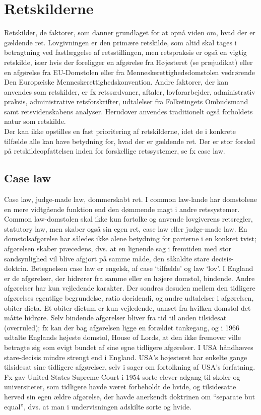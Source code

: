 \documentclass[]{book}
\begin{document}
\hypertarget{retskilderne}{%
\section{Retskilderne}\label{retskilderne}}

Retskilder, de faktorer, som danner grundlaget for at opnå viden om, hvad der er gældende ret.
Lovgivningen er den primære retskilde, som altid skal tages i betragtning ved fastlæggelse af retsstillingen, men retspraksis er også en vigtig retskilde, især hvis der foreligger en afgørelse fra Højesteret (se præjudikat) eller en afgørelse fra EU-Domstolen eller fra Menneskerettighedsdomstolen vedrørende Den Europæiske Menneskerettighedskonvention.
Andre faktorer, der kan anvendes som retskilder, er fx retssædvaner, aftaler, lovforarbejder, administrativ praksis, administrative retsforskrifter, udtalelser fra Folketingets Ombudsmand samt retsvidenskabens analyser. Herudover anvendes traditionelt også forholdets natur som retskilde.\\
Der kan ikke opstilles en fast prioritering af retskilderne, idet de i konkrete tilfælde alle kan have betydning for, hvad der er gældende ret.
Der er stor forskel på retskildeopfattelsen inden for forskellige retssystemer, se fx case law.

\hypertarget{case-law}{%
\subsection{Case law}\label{case-law}}

Case law, judge-made law, dommerskabt ret. I common law-lande har domstolene en mere vidtgående funktion end den dømmende magt i andre retssystemer. Common law-domstolen skal ikke kun fortolke og anvende lovgiverens retsregler, statutory law, men skaber også sin egen ret, case law eller judge-made law. En domstolsafgørelse har således ikke alene betydning for parterne i en konkret tvist; afgørelsen skaber præcedens, dvs. at en lignende sag i fremtiden med stor sandsynlighed vil blive afgjort på samme måde, den såkaldte stare decisis-doktrin.
Betegnelsen case law er engelsk, af case `tilfælde' og law `lov'.
I England er de afgørelser, der hidrører fra samme eller en højere domstol, bindende. Andre afgørelser har kun vejledende karakter. Der sondres desuden mellem den tidligere afgørelses egentlige begrundelse, ratio decidendi, og andre udtalelser i afgørelsen, obiter dicta. Et obiter dictum er kun vejledende, uanset fra hvilken domstol det måtte hidrøre.
Selv bindende afgørelser bliver fra tid til anden tilsidesat (overruled); fx kan der bag afgørelsen ligge en forældet tankegang, og i 1966 udtalte Englands højeste domstol, House of Lords, at den ikke fremover ville betragte sig som evigt bundet af sine egne tidligere afgørelser.
I USA håndhæves stare-decisis mindre strengt end i England. USA's højesteret har enkelte gange tilsidesat sine tidligere afgørelser, selv i sager om fortolkning af USA's forfatning. Fx gav United States Supreme Court i 1954 sorte elever adgang til skoler og universiteter, som tidligere havde været forbeholdt de hvide, og tilsidesatte herved sin egen ældre afgørelse, der havde anerkendt doktrinen om ``separate but equal'', dvs. at man i undervisningen adskilte sorte og hvide.
\end{document}
